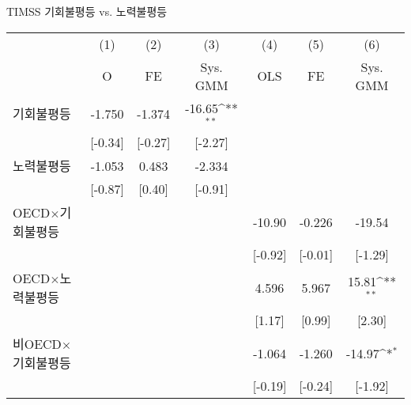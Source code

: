 \centering
\def\sym#1{\ifmmode^{#1}\else\(^{#1}\)\fi}
\caption{TIMSS 기회불평등 vs. 노력불평등\label{tab:timsscomp}}
\begin{tabular}{l*{6}{c}}
\toprule
                    &\multicolumn{1}{c}{(1)}&\multicolumn{1}{c}{(2)}&\multicolumn{1}{c}{(3)}&\multicolumn{1}{c}{(4)}&\multicolumn{1}{c}{(5)}&\multicolumn{1}{c}{(6)}\\
                    &\multicolumn{1}{c}{O}&\multicolumn{1}{c}{FE}&\multicolumn{1}{c}{Sys. GMM}&\multicolumn{1}{c}{OLS}&\multicolumn{1}{c}{FE}&\multicolumn{1}{c}{Sys. GMM}\\
\midrule
기회불평등        &      -1.750         &      -1.374         &      -16.65\sym{**} &                     &                     &                     \\
                    &     [-0.34]         &     [-0.27]         &     [-2.27]         &                     &                     &                     \\
\addlinespace
노력불평등        &      -1.053         &       0.483         &      -2.334         &                     &                     &                     \\
                    &     [-0.87]         &      [0.40]         &     [-0.91]         &                     &                     &                     \\
\addlinespace
OECD$\times$기회불평등&                     &                     &                     &      -10.90         &      -0.226         &      -19.54         \\
                    &                     &                     &                     &     [-0.92]         &     [-0.01]         &     [-1.29]         \\
\addlinespace
OECD$\times$노력불평등&                     &                     &                     &       4.596         &       5.967         &       15.81\sym{**} \\
                    &                     &                     &                     &      [1.17]         &      [0.99]         &      [2.30]         \\
\addlinespace
비OECD$\times$기회불평등&                     &                     &                     &      -1.064         &      -1.260         &      -14.97\sym{*}  \\
                    &                     &                     &                     &     [-0.19]         &     [-0.24]         &     [-1.92]         \\

\end{tabular}
